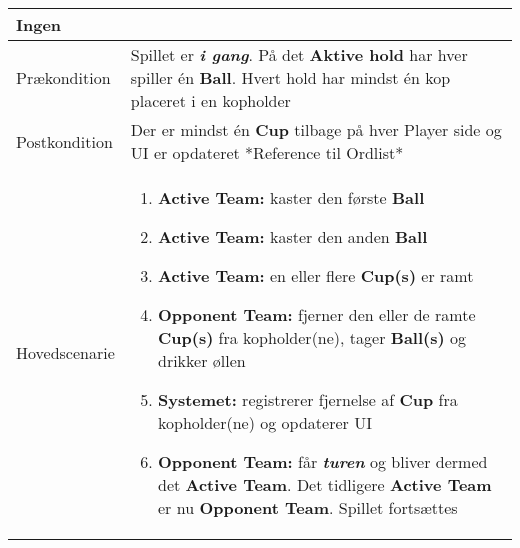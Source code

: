 \documentclass[Kravspecifikation/Kravspec_Main.tex]{subfiles}
\begin{document}
\begin{longtable}[]{@{}ll@{}}
\begin{minipage}[t]{0.47\columnwidth}
{Ingen}\strut
\end{minipage}\tabularnewline
\toprule
\begin{minipage}[t]{0.47\columnwidth}\raggedright
{Prækondition}\strut
\end{minipage} & \begin{minipage}[t]{0.47\columnwidth}\raggedright
{Spillet er \textbf{\textit{i gang}}. På det \textbf{Aktive hold} har hver spiller én \textbf{Ball}. Hvert hold har mindst én kop placeret i en kopholder}\strut
\end{minipage}\tabularnewline
\toprule
\begin{minipage}[t]{0.47\columnwidth}\raggedright
{Postkondition}\strut
\end{minipage} & \begin{minipage}[t]{0.47\columnwidth}\raggedright
{Der er mindst én \textbf{Cup} tilbage på hver Player side og UI er opdateret *Reference til Ordlist*}\strut
\end{minipage}\tabularnewline
\toprule
\begin{minipage}[t]{0.47\columnwidth}\raggedright
{Hovedscenarie}\strut
\end{minipage} & \begin{minipage}[t]{0.47\columnwidth}\raggedright
\begin{enumerate}
\tightlist
\item
  {\textbf{Active Team:} kaster den første \textbf{Ball}}
\item
  {\textbf{Active Team:} kaster den anden \textbf{Ball}}
\item
  {\textbf{Active Team:} en eller flere \textbf{Cup(s)} er ramt 
  }
\item
    {\textbf{Opponent Team:} fjerner den eller de ramte \textbf{Cup(s)} fra kopholder(ne), tager \textbf{Ball(s)} og drikker øllen}
\item 
    {\textbf{Systemet:} registrerer fjernelse af \textbf{Cup} fra kopholder(ne) og opdaterer UI}
\item  
    {\textbf{Opponent Team:} får \textbf{\textit{turen}} og bliver dermed det \textbf{Active Team}. Det tidligere \textbf{Active Team} er nu \textbf{Opponent Team}. Spillet fortsættes}
\end{enumerate}\strut


\end{minipage}
\end{longtable}
\end{document}

